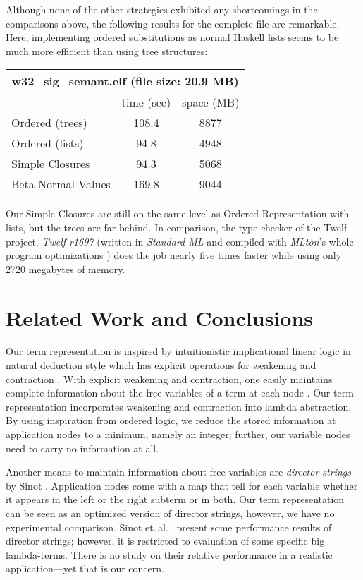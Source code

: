 \documentclass[submission,copyright,creativecommons]{eptcs}
\newcommand{\abbrev}[1]{#1} \newcommand{\cf}{\abbrev{cf.}\ }
\newcommand{\etal}{\abbrev{et.\,al.}}
\begin{document}
Although none of the other strategies exhibited any shortcomings in the comparisons above, the following results for the complete file are remarkable. Here, implementing ordered substitutions as normal Haskell lists seems to be much more efficient than using tree structures: 

\begin{center}
 \begin{tabular}{| l || c | c |}
\multicolumn{3}{c}{\textsf{w32\_sig\_semant.elf} (file size: 20.9 MB)}\\
\hline
& time (sec) & space (MB) \\
\hline
\hline
Ordered (trees) & 108.4 & 8877\\
\hline
Ordered (lists) & 94.8 & 4948\\ \hline
Simple Closures & 94.3 & 5068 \\ \hline
Beta Normal Values & 169.8 & 9044  \\
\hline
\end{tabular}
\end{center}

Our Simple Closures are still on the same level as Ordered Representation with lists, but the trees are far behind. 
In comparison, the type checker of the Twelf project, \emph{Twelf
  r1697} (written in \emph{Standard ML} and compiled with
\emph{MLton}'s whole program optimizations \cite{fluetWeeks:icfp01}) 
does the job nearly five
times faster while using only 2720 megabytes of
memory. 






\section{Related Work and Conclusions}
\label{sec:concl}

Our term representation is inspired by intuitionistic implicational
linear logic in natural deduction style which has explicit operations
for weakening and contraction
\cite{bentonBiermanDePaivaHyland:tlca93}.  With explicit weakening and
contraction, one easily maintains complete information about the free
variables of a term at each node \cite{kesnerLengrand:infcomp07}.  Our
term representation incorporates weakening and contraction into lambda
abstraction.  By using inspiration from ordered logic, we reduce the
stored information at application nodes to a minimum, namely an
integer; further, our variable nodes need to carry no information at all.

Another means to maintain information about free variables are
\emph{director strings} by Sinot \cite{sinot:jlc05}.  Application
nodes come with a map that tell for each variable whether it appears
in the left or the right subterm or in both.  Our term representation
can be seen as an optimized version of director strings, however, we
have no experimental comparison. 
Sinot \etal~\cite{fernandezMackieSinot:aaecc05} present some
performance results of director strings; however, it is restricted
to evaluation of some specific big lambda-terms.  There is no study on
their relative performance in a realistic application---yet that is
our concern.
\end{document}
